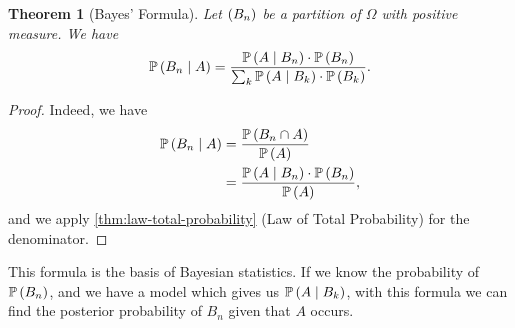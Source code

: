 \documentclass{article}
\newtheorem{theorem}{Theorem}[section]
\theoremstyle{definition}
\theoremstyle{remark}
\newcommand{\Prob}{\mathbb{P}}
\newcommand{\Conditional}[2]{#1\mid #2}
\begin{document}
\begin{theorem}[Bayes' Formula]
    \label{thm:bayes}%
    Let \(\left(B_n\right)\) be a partition of \(\Omega\) with positive measure. We have
    \[
        \Prob\pqty{\Conditional{B_n}{A}} = \frac{\Prob\pqty{\Conditional{A}{B_n}} \cdot \Prob\pqty{B_n}}{\sum_{k} \Prob\pqty{\Conditional{A}{B_k}} \cdot \Prob\pqty{B_k}}.
    \]
\end{theorem}

\begin{proof}
    Indeed, we have
    \begin{align*}
        \Prob\pqty{\Conditional{B_n}{A}} &= \frac{\Prob\pqty{B_n \cap A}}{\Prob\pqty{A}} \\
        &= \frac{\Prob\pqty{\Conditional{A}{B_n}} \cdot \Prob\pqty{B_n}}{\Prob\pqty{A}},
    \end{align*}
    and we apply \autoref{thm:law-total-probability} (Law of Total Probability) for the denominator.
\end{proof}

This formula is the basis of Bayesian statistics. If we know the probability of \(\Prob\pqty{B_n}\), and we have a model which gives us \(\Prob\pqty{\Conditional{A}{B_k}}\), with this formula we can find the posterior probability of \(B_n\) given that \(A\) occurs.
\end{document}
